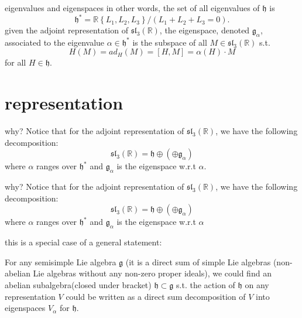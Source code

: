 \documentclass{beamer}
\newcommand{\R}{\mathbb{R}}
\begin{document}
\begin{frame}{eigenvalues and eigenspaces}
	in other words, the set of all eigenvalues of $\mathfrak{h}$ is  \[
		\mathfrak{h}^* = \R \left\{ L_1,L_2,L_3 \right\} / (L_1+L_2+L_3=0). 
		\] given the adjoint representation of  $\mathfrak{sl}_3(\R)$, the eigenspace, denoted $\mathfrak{g}_{\alpha}$, associated to the eigenvalue $\alpha \in \mathfrak{h}^*$ is the subspace of all  $M \in \mathfrak{sl}_3(\R)$ s.t. \[
	H(M) = ad_H(M) = [H, M] = \alpha(H) \cdot M
\] for all $H \in \mathfrak{h}$.
\end{frame}


\section{representation}

\begin{frame}{why?}
	Notice that for the adjoint representation of $\mathfrak{sl}_3(\R)$, we have the following decomposition:  \[
		\mathfrak{sl}_3(\R) = \mathfrak{h} \oplus \left( \oplus \mathfrak{g}_\alpha \right) 
	\] where $\alpha$ ranges over $\mathfrak{h}^*$ and $\mathfrak{g}_{\alpha}$ is the eigenspace w.r.t $\alpha$.
\end{frame}

\begin{frame}{why?}
	Notice that for the adjoint representation of $\mathfrak{sl}_3(\R)$, we have the following decomposition:  \[
		\mathfrak{sl}_3(\R) = \mathfrak{h} \oplus \left( \oplus \mathfrak{g}_\alpha \right) 
	\] where $\alpha$ ranges over $\mathfrak{h}^*$ and $\mathfrak{g}_{\alpha}$ is the eigenspace w.r.t $\alpha$

	this is a special case of a general statement:
	\begin{theom}{}{}
		For any semisimple Lie algebra $\mathfrak{g}$ (it is a direct sum of simple Lie algebras (non-abelian Lie algebras without any non-zero proper ideals), we could find an abelian subalgebra(closed under bracket)  $\mathfrak{h} \subset \mathfrak{g}$ s.t. the action of $\mathfrak{h}$ on any representation $V$ could be written as a direct sum decomposition of $V$ into eigenspaces  $V_{\alpha}$ for $\mathfrak{h}$.
	\end{theom}
\end{frame}
\end{document}
